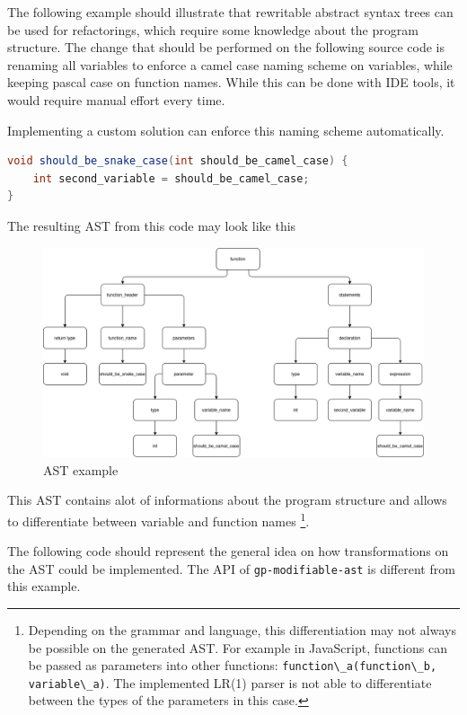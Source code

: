 The following example should illustrate that rewritable abstract syntax trees can be used for refactorings, which require some knowledge about the program structure.
The change that should be performed on the following source code is renaming all variables to enforce a camel case naming scheme on variables, while keeping
pascal case on function names. While this can be done with IDE tools, it would require manual effort every time.

Implementing a custom solution can enforce this naming scheme automatically.

\begin{lstlisting}[language=Java, caption=Example of untransformed code]
void should_be_snake_case(int should_be_camel_case) {
    int second_variable = should_be_camel_case;
}
\end{lstlisting}

The resulting AST from this code may look like this
\begin{figure}[H]
    \centering
    \includegraphics[scale=0.40]{fig/ast_example.png}
    \caption{AST example}
\end{figure}

This AST contains alot of informations about the program structure and allows to differentiate between variable and function names
\footnote{
    Depending on the grammar and language, this differentiation may not always be possible on the generated AST. 
    For example in JavaScript, functions can be passed as parameters into other functions: 
    \lstinline{function\_a(function\_b, variable\_a)}.
    The implemented LR(1) parser is not able to differentiate between the types of the parameters in this case.}. 

The following code should represent the general idea on how transformations on the AST could be implemented. 
The API of \verb|gp-modifiable-ast| is different from this example.

